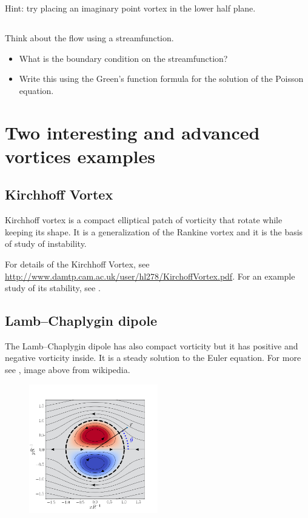 \documentclass[11pt,letterpaper]{report}
\begin{document}
Hint: try placing an imaginary point vortex in the lower half plane.

\subsection{}
Think about the flow using a streamfunction. 
\begin{itemize}
    \item What is the boundary condition on the streamfunction? 
    \item Write this using the Green's function formula for the solution of the Poisson equation.
\end{itemize}

\section{Two interesting and advanced vortices examples}
\subsection{Kirchhoff Vortex} Kirchhoff vortex is a compact elliptical patch of vorticity that rotate while keeping its shape. It is a generalization of the Rankine vortex and it is the basis of study of instability. 

For details of the Kirchhoff Vortex, see \url{http://www.damtp.cam.ac.uk/user/hl278/KirchoffVortex.pdf}. For an example study of its stability, see \cite{MitchellRossi_08}.

\subsection{Lamb–Chaplygin dipole} The Lamb–Chaplygin dipole has also compact vorticity but it has positive and negative vorticity inside. It is a steady solution to the Euler equation. For more see \cite{MeleshkoHeijst_94}, image above from wikipedia.
\begin{figure}
    \centering
    \includegraphics[width = 0.5\textwidth]{../Session_8/figs/Lamb-Chaplygin_dipole}
\end{figure}
\end{document}
